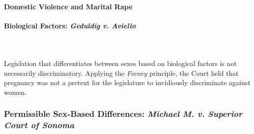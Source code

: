 
\paragraph{Domestic Violence and Marital Rape}
% 
 
\paragraph{Biological Factors: \emph{Geduldig v. Aviello}}
~\\\\
Legislation that differentiates between sexes based on biological factors is 
not necessarily discriminatory. Applying the \emph{Feeney} principle, the 
Court held that pregnancy was not a pretext for the legislature to invidiously 
discriminate against women.

 
\subsubsection{Permissible Sex-Based Differences: \emph{Michael M. v. Superior 
Court of Sonoma}}

